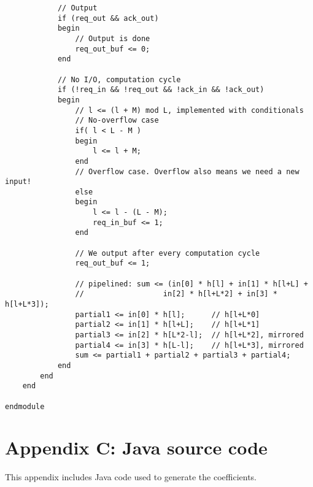 \begin{verbatim}
            // Output
            if (req_out && ack_out)
            begin
                // Output is done
                req_out_buf <= 0;
            end

            // No I/O, computation cycle
            if (!req_in && !req_out && !ack_in && !ack_out)
            begin
                // l <= (l + M) mod L, implemented with conditionals
                // No-overflow case
                if( l < L - M )
                begin
                    l <= l + M;
                end
                // Overflow case. Overflow also means we need a new input!
                else
                begin
                    l <= l - (L - M);
                    req_in_buf <= 1;
                end

                // We output after every computation cycle
                req_out_buf <= 1;

                // pipelined: sum <= (in[0] * h[l] + in[1] * h[l+L] + 
                //                  in[2] * h[l+L*2] + in[3] * h[l+L*3]);
                partial1 <= in[0] * h[l];      // h[l+L*0]
                partial2 <= in[1] * h[l+L];    // h[l+L*1]
                partial3 <= in[2] * h[L*2-l];  // h[l+L*2], mirrored
                partial4 <= in[3] * h[L-l];    // h[l+L*3], mirrored
                sum <= partial1 + partial2 + partial3 + partial4;
            end
        end
    end

endmodule

\end{verbatim}

\section{Appendix C: Java source code} \label{sec:java}
This appendix includes Java code used to generate the coefficients.

